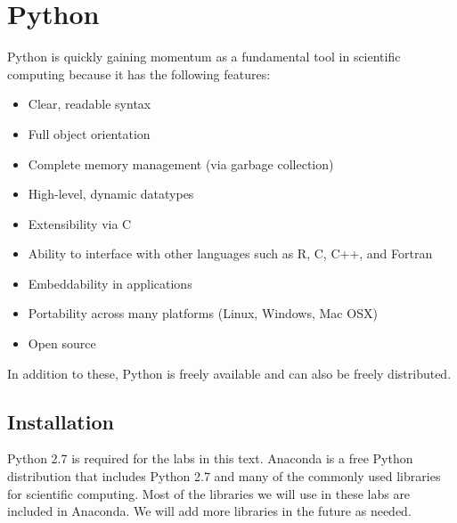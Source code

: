 \label{lab:Essential_Python}



\section*{Python}
Python is quickly gaining momentum as a fundamental tool in scientific computing because it has the following features:
\begin{itemize}
\item Clear, readable syntax
\item Full object orientation
\item Complete memory management (via garbage collection)
\item High-level, dynamic datatypes
\item Extensibility via C
\item Ability to interface with other languages such as R, C, C++, and Fortran
\item Embeddability in applications
\item Portability across many platforms (Linux, Windows, Mac OSX)
\item Open source
\end{itemize}
In addition to these, Python is freely available and can also be freely distributed.

\subsection*{Installation}
Python 2.7 is required for the labs in this text.
Anaconda is a free Python distribution that includes Python 2.7 and many of the commonly used libraries for scientific computing. 
Most of the libraries we will use in these labs are included in Anaconda.
We will add more libraries in the future as needed.

